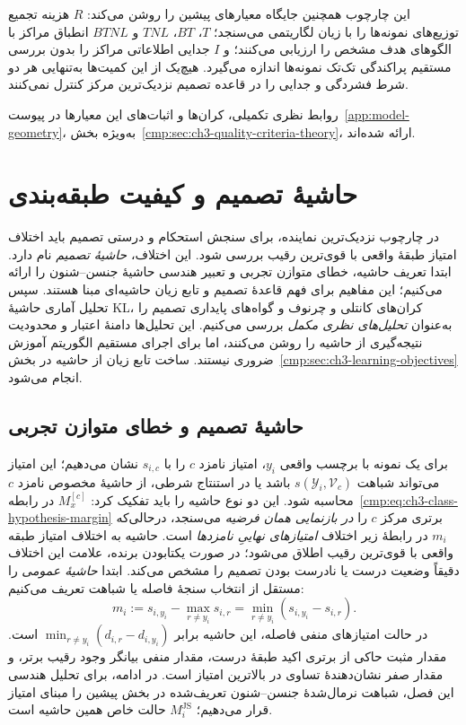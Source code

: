 این چارچوب همچنین جایگاه معیارهای پیشین را روشن می‌کند: $R$ هزینه تجمیع توزیع‌های نمونه‌ها را با زیان لگاریتمی می‌سنجد؛ $T$، $BT$، $TNL$ و $BTNL$ انطباق مراکز با الگوهای هدف مشخص را ارزیابی می‌کنند؛ و $I$ جدایی اطلاعاتی مراکز را بدون بررسی مستقیم پراکندگی تک‌تک نمونه‌ها اندازه می‌گیرد. هیچ‌یک از این کمیت‌ها به‌تنهایی هر دو شرط فشردگی و جدایی را در قاعده تصمیم نزدیک‌ترین مرکز کنترل نمی‌کنند.

روابط نظری تکمیلی، کران‌ها و اثبات‌های این معیارها در پیوست~\ref{app:model-geometry}، به‌ویژه بخش~\ref{cmp:sec:ch3-quality-criteria-theory}، ارائه شده‌اند.


\section{حاشیهٔ تصمیم و کیفیت طبقه‌بندی}
\label{cmp:sec:ch3-normalized-margin}
\label{cmp:subsec:ch3-label-estimation-to-margin}
در چارچوب نزدیک‌ترین نماینده، برای سنجش استحکام
و درستی تصمیم باید اختلاف امتیاز طبقهٔ واقعی با
قوی‌ترین رقیب بررسی شود. این اختلاف،
\emph{حاشیهٔ تصمیم} نام دارد.
ابتدا تعریف حاشیه، خطای متوازن تجربی
و تعبیر هندسی حاشیهٔ جنسن--شنون را
ارائه می‌کنیم؛ این مفاهیم برای
فهم قاعدهٔ تصمیم و تابع زیان
حاشیه‌ای مبنا هستند.
سپس تحلیل آماری حاشیهٔ KL،
کران‌های کانتلی و چرنوف
و گواه‌های پایداری تصمیم را
به‌عنوان \emph{تحلیل‌های نظری مکمل}
بررسی می‌کنیم. این تحلیل‌ها
دامنهٔ اعتبار و محدودیت
نتیجه‌گیری از حاشیه را
روشن می‌کنند، اما برای
اجرای مستقیم الگوریتم آموزش
ضروری نیستند. ساخت تابع زیان
از حاشیه در
بخش~\ref{cmp:sec:ch3-learning-objectives}
انجام می‌شود.

\subsection{حاشیهٔ تصمیم و خطای متوازن تجربی}
\label{cmp:subsec:ch3-decision-margin-empirical}
برای یک نمونه با برچسب واقعی $y_i$،
امتیاز نامزد $c$ را با $s_{i,c}$
نشان می‌دهیم؛ این امتیاز می‌تواند
شباهت $s(\mathscr Y_i,\mathcal V_c)$
باشد یا در استنتاج شرطی، از
حاشیهٔ مخصوص نامزد $c$ محاسبه شود.
این دو نوع حاشیه را باید تفکیک کرد:
$M_x^{[c]}$ در رابطه~\eqref{cmp:eq:ch3-class-hypothesis-margin}
برتری مرکز $c$ را \emph{در بازنمایی همان فرضیه}
می‌سنجد، درحالی‌که $m_i$ در رابطهٔ زیر
اختلاف \emph{امتیازهای نهاییِ نامزدها} است.
حاشیه به اختلاف امتیاز طبقه واقعی
با قوی‌ترین رقیب اطلاق می‌شود؛
در صورت یکتابودن برنده، علامت
این اختلاف دقیقاً وضعیت درست یا
نادرست بودن تصمیم را مشخص می‌کند.
ابتدا \emph{حاشیهٔ عمومی} را مستقل از انتخاب
سنجهٔ فاصله یا شباهت تعریف می‌کنیم:
\begin{equation}\label{cmp:eq:ch3-general-decision-margin}
\boxed{
m_i:=s_{i,y_i}-\max_{r\ne y_i}s_{i,r}
=\min_{r\ne y_i}(s_{i,y_i}-s_{i,r}).
}
\end{equation}
در حالت امتیازهای منفی فاصله، این حاشیه
برابر $\min_{r\ne y_i}(d_{i,r}-d_{i,y_i})$
است. مقدار مثبت حاکی از برتری اکید طبقهٔ درست،
مقدار منفی بیانگر وجود رقیب برتر، و مقدار صفر
نشان‌دهندهٔ تساوی در بالاترین امتیاز است.
در ادامه، برای تحلیل هندسی این فصل،
شباهت نرمال‌شدهٔ جنسن--شنون
تعریف‌شده در بخش پیشین را
مبنای امتیاز قرار می‌دهیم؛
$M_i^{\mathrm{JS}}$ حالت خاص همین حاشیه است.

